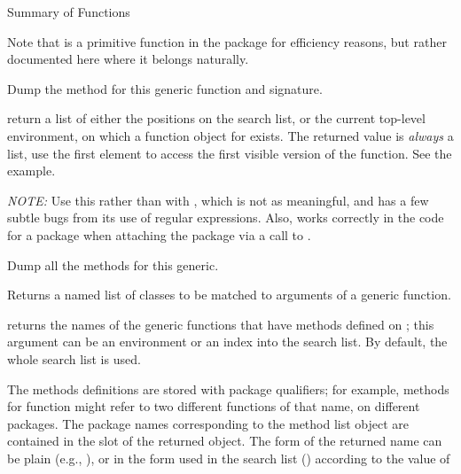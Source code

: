 \begin{Section}{Summary of Functions}
\begin{description}
Note that  is a primitive function in
the  package
for efficiency 
reasons, but rather documented here where it belongs naturally.

\item[\code{dumpMethod}:] 
Dump the method for this generic function and signature.

\item[\code{findFunction}:] 
return a list of either the positions on the search list, or the
current top-level environment, on which a function object
for  exists.  The returned value is \emph{always} a
list, use the first element to access the first visible version
of the function.  See the example.

\emph{NOTE:} Use this rather than  with
, which is not as meaningful, and has a few
subtle bugs from its use of regular expressions.  Also,
 works correctly in the code for a package
when attaching the package via a call to .

\item[\code{dumpMethods}:] 
Dump all the methods for this generic.

\item[\code{signature}:] 
Returns a named list of classes to be matched to arguments of a
generic function.

\item[\code{getGenerics}:] returns the names of the generic
functions that have methods defined on ; this
argument can be an environment or an index into the search
list.  By default, the whole search list is used.

The methods definitions are stored with
package qualifiers; for example, methods for function
 might refer to two different functions
of that name, on different packages.  The package names
corresponding to the method list object are contained in the
slot  of the returned object.  The form of
the returned name can be plain (e.g., ), or in
the form used in the search list ()
according to the value of 


\end{description}

\end{Section}
%
